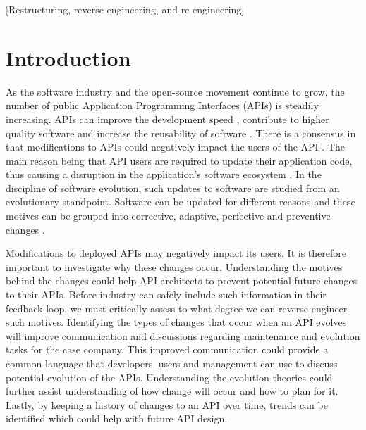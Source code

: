 \documentclass{sig-alternate}
\begin{document}
[Restructuring, reverse engineering, and re-engineering]


\newpage
\section{Introduction} \label{introduction}
As the software industry and the open-source movement continue to grow, the number of public Application Programming Interfaces (APIs) is steadily increasing. APIs can improve the development speed \cite{stylos2006comparing}, contribute to higher quality software \cite{stylos2006comparing} and increase the reusability of software \cite{afonso2012evaluating}. There is a consensus in that modifications to APIs could negatively impact the users of the API \cite{google_talk, henning2007api, mcdonnell2013empirical, robbes2012developers}. The main reason being that API users are required to update their application code, thus causing a disruption in the application's software ecosystem \cite{messerschmitt2005software}. 
In the discipline of software evolution, such updates to software are studied from an evolutionary standpoint. Software can be updated for different reasons and these motives can be grouped into corrective, adaptive, perfective and preventive changes \cite{lientz1980software}. 

Modifications to deployed APIs may negatively impact its users. It is therefore important to investigate why these changes occur. Understanding the motives behind the changes could help API architects to prevent potential future changes to their APIs. Before industry can safely include such information in their feedback loop, we must critically assess to what degree we can reverse engineer such motives. 
Identifying the types of changes that occur when an API evolves will improve communication and discussions regarding maintenance and evolution tasks for the case company. This improved communication could provide a common language that developers, users and management can use to discuss potential evolution of the APIs. Understanding the evolution theories could further assist understanding of how change will occur and how to plan for it. Lastly, by keeping a history of changes to an API over time, trends can be identified which could help with future API design.
\end{document}
